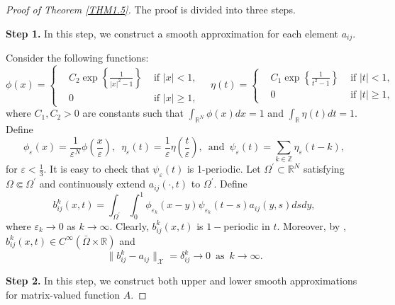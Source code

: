 \documentclass[11pt,reqno]{amsart}
\numberwithin{equation}{section}
\begin{document}
\begin{proof}[Proof of Theorem \ref{THM1.5}]
The proof is divided into three steps. 

{\bf Step 1.} In this step, we construct a smooth approximation for each element $a_{ij}$.

Consider the following functions:
\begin{equation*}
\phi(x)=\left\{
\begin{aligned}
&C_{2}\exp \left\{ \frac{1}{|x|^{2}-1} \right\} &\text{ if } |x|<1,\\
&0  &\text{ if } |x|\geq 1,
\end{aligned}
	\right.
\quad
\eta(t)=\left\{
\begin{aligned}
&C_{1}\exp \left\{ \frac{1}{t^{2}-1} \right\} &\text{ if } |t|<1,\\
&0  &\text{ if } |t|\geq 1,
\end{aligned}
	\right.
\end{equation*}
where $C_{1},C_{2}>0$ are constants such that $\int_{\mathbb{R}^{N}}\phi(x)dx=1$ and $\int_{\mathbb{R}} \eta(t)dt=1 $. Define
%
\begin{equation*}
\phi_{\varepsilon}(x)= \frac{1}{\varepsilon^{N}}\phi\left( \frac{x}{\varepsilon} \right),
\enspace
\eta_{\varepsilon}(t)= \frac{1}{\varepsilon}\eta \left(\frac{t}{\varepsilon}\right),
\enspace\text{and}\enspace
\psi_{\varepsilon}(t)=\sum_{k \in \mathbb{Z}} \eta_{\varepsilon}(t-k),
\end{equation*}
%
for $\varepsilon<\frac{1}{3}$.
It is easy to check that $\psi_{\varepsilon}(t)$ is 1-periodic. Let $\Omega^{'}\subset\mathbb{R}^{N}$ satisfying $\Omega\Subset\Omega^{'}$ and continuously extend $a_{ij}(\cdot,t)$ to $\Omega^{\prime}$.
Define
\begin{equation*}
b^{k}_{ij}(x,t) = \int_{\Omega^{\prime}}\int_{0}^{1}\phi_{\varepsilon_{k}}(x-y)\psi_{\varepsilon_{k}}(t-s)a_{ij}(y,s)dsdy,
\end{equation*}
where $\varepsilon_{k} \to 0$ as $k\to\infty$.
Clearly, $b^{k}_{ij}(x,t)$ is $1-$periodic in $t$. Moreover,
by \cite[Appendix C, Theorem 7]{Evans}, $b^{k}_{ij}(x,t) \in C^{\infty}(\bar{\Omega}\times\mathbb{R})$ and
\begin{equation*}
\| b^{k}_{ij} - a_{ij}\|_{\mathcal{X}} = \delta^{k}_{ij} \to 0
\enspace \text{as} \enspace k\to\infty.
\end{equation*}

{\bf Step 2.} In this step, we construct both upper and lower smooth approximations for matrix-valued function $A$.


\end{proof}
\end{document}
